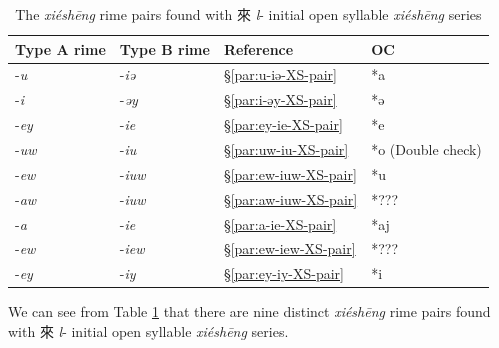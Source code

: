 \begin{table}[htbp]
    \centering
    \begin{tabular}{|l|l|l|l|}
    \hline
    \textbf{Type A rime}  & \textbf{Type B rime} & \textbf{Reference} &  OC \\ \hline
-\textit{u} & -\textit{iə} & §\ref{par:u-iə-XS-pair} & *a  \\\hline
-\textit{i} & -\textit{əy}  & §\ref{par:i-əy-XS-pair} & *ə   \\ \hline
 -\textit{ey} & -\textit{ie} & §\ref{par:ey-ie-XS-pair} & *e \\ \hline
 -\textit{uw} & -\textit{iu} & §\ref{par:uw-iu-XS-pair} & *o (Double check) \\ \hline
 -\textit{ew} & -\textit{iuw} & §\ref{par:ew-iuw-XS-pair} & *u \\ \hline
 -\textit{aw} 
 & -\textit{iuw}
 & §\ref{par:aw-iuw-XS-pair} & *??? \\ \hline
 
 -\textit{a} & -\textit{ie} & §\ref{par:a-ie-XS-pair} & *aj \\ \hline
 -\textit{ew} & -\textit{iew} & §\ref{par:ew-iew-XS-pair} & *??? \\ \hline
 -\textit{ey} & -\textit{iy} & §\ref{par:ey-iy-XS-pair} & *i \\ \hline
    \end{tabular}
    \caption{The \textit{xiéshēng} rime pairs found with  來 \textit{l}- initial open syllable \textit{xiéshēng} series}
    \label{tab:l-XS-rime-pairs}
\end{table}

We can see from Table \ref{tab:l-XS-rime-pairs} that there are nine distinct \textit{xiéshēng} rime pairs found with  來 \textit{l}- initial open syllable \textit{xiéshēng} series. 

